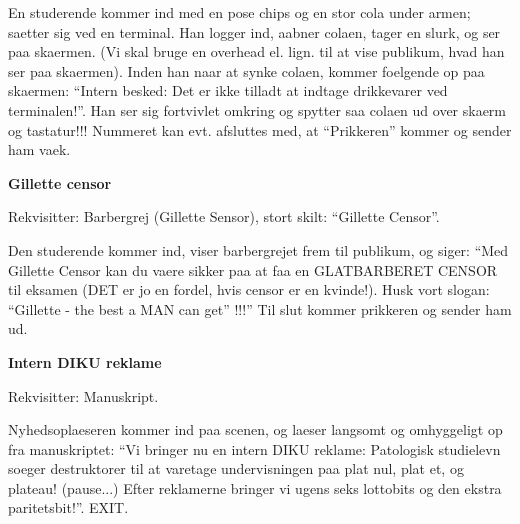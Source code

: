 \documentclass[a4paper,11pt]{article}
\begin{document}
\begin{sketch}
En studerende kommer ind med en pose chips og en stor cola
under armen; saetter sig ved en terminal. Han logger ind,
aabner colaen, tager en slurk, og ser paa skaermen. (Vi skal
bruge en overhead el. lign. til at vise publikum, hvad han ser
paa skaermen). Inden han naar at synke colaen, kommer
foelgende op paa skaermen: ``Intern besked: Det er ikke tilladt
at indtage drikkevarer ved terminalen!''. Han ser sig
fortvivlet omkring og spytter saa colaen ud over skaerm og
tastatur!!!
Nummeret kan evt. afsluttes med, at ``Prikkeren'' kommer og
sender ham vaek.
\end{sketch}

\vspace{2cm}

\begin{center}
{\bf Gillette censor}
\end{center}
\begin{roles}
 
\end{roles}

Rekvisitter: Barbergrej (Gillette Sensor), 
             stort skilt: ``Gillette Censor''.

\begin{sketch}
Den studerende kommer ind, viser barbergrejet frem til
publikum, og siger: ``Med Gillette Censor kan du vaere sikker
paa at faa en GLATBARBERET CENSOR til eksamen (DET er jo en
fordel, hvis censor er en kvinde!). Husk vort slogan:
``Gillette - the best a MAN can get'' !!!''
Til slut kommer prikkeren og sender ham ud.
\end{sketch}

\vspace{2cm}

\begin{center}
{\bf Intern DIKU reklame}
\end{center}
\begin{roles}
\strut
\end{roles}

Rekvisitter: Manuskript.

\begin{sketch}
Nyhedsoplaeseren kommer ind paa scenen, og laeser langsomt og
omhyggeligt op fra manuskriptet: ``Vi bringer nu en intern DIKU
reklame: Patologisk studielevn soeger destruktorer til at
varetage undervisningen paa plat nul, plat et, og plateau!
(pause...) Efter reklamerne bringer vi ugens seks lottobits og
den ekstra paritetsbit!''. EXIT.
\end{sketch}
\end{document}
